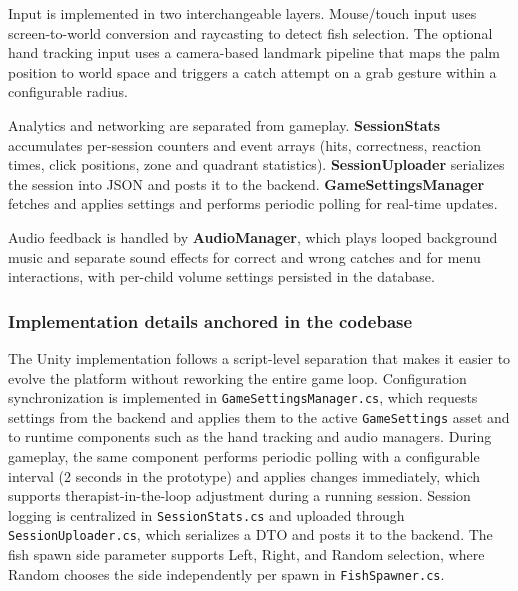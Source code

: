 \documentclass[12pt]{article}
\begin{document}
Input is implemented in two interchangeable layers. Mouse/touch input uses screen-to-world conversion and raycasting to detect fish selection. The optional hand tracking input uses a camera-based landmark pipeline that maps the palm position to world space and triggers a catch attempt on a grab gesture within a configurable radius.

Analytics and networking are separated from gameplay. \textbf{SessionStats} accumulates per-session counters and event arrays (hits, correctness, reaction times, click positions, zone and quadrant statistics). \textbf{SessionUploader} serializes the session into JSON and posts it to the backend. \textbf{GameSettingsManager} fetches and applies settings and performs periodic polling for real-time updates.

Audio feedback is handled by \textbf{AudioManager}, which plays looped background music and separate sound effects for correct and wrong catches and for menu interactions, with per-child volume settings persisted in the database.

\subsubsection*{Implementation details anchored in the codebase}
The Unity implementation follows a script-level separation that makes it easier to evolve the platform without reworking the entire game loop. Configuration synchronization is implemented in \texttt{GameSettingsManager.cs}, which requests settings from the backend and applies them to the active \texttt{GameSettings} asset and to runtime components such as the hand tracking and audio managers. During gameplay, the same component performs periodic polling with a configurable interval (2 seconds in the prototype) and applies changes immediately, which supports therapist-in-the-loop adjustment during a running session. Session logging is centralized in \texttt{SessionStats.cs} and uploaded through \texttt{SessionUploader.cs}, which serializes a DTO and posts it to the backend. The fish spawn side parameter supports Left, Right, and Random selection, where Random chooses the side independently per spawn in \texttt{FishSpawner.cs}.
\end{document}
